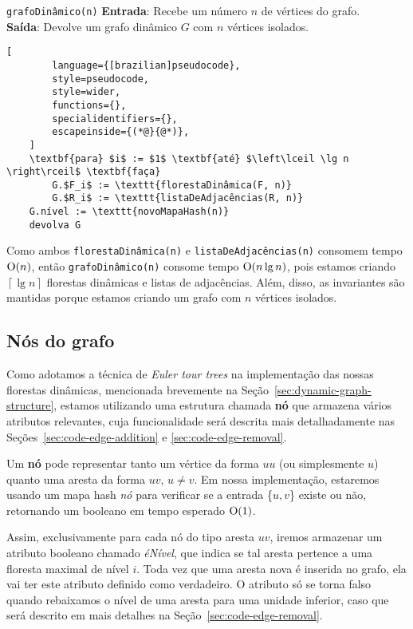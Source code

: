 \begin{programruledcaption}{\texttt{grafoDinâmico(n)} \label{prog:newGD}}
    \noindent\textbf{Entrada}: Recebe um número $n$ de vértices do grafo. \\
    \textbf{Saída}: Devolve um grafo dinâmico $G$ com $n$ vértices isolados.
    \vspace{-0.5\baselineskip}
    \begin{lstlisting}[
        language={[brazilian]pseudocode},
        style=pseudocode,
        style=wider,
        functions={},
        specialidentifiers={},
        escapeinside={(*@}{@*)},
    ]
    \textbf{para} $i$ := $1$ \textbf{até} $\left\lceil \lg n \right\rceil$ \textbf{faça}
        G.$F_i$ := \texttt{florestaDinâmica(F, n)}
        G.$R_i$ := \texttt{listaDeAdjacências(R, n)}
    G.nível := \texttt{novoMapaHash(n)}
    devolva G
    \end{lstlisting}
    \vspace{-0.5\baselineskip}
\end{programruledcaption}

Como ambos \texttt{florestaDinâmica(n)} e \texttt{listaDeAdjacências(n)} consomem tempo $\mathrm{O}(n)$, então \texttt{grafoDinâmico(n)} consome tempo $\mathrm{O}(n \lg n)$, pois estamos criando $\left\lceil \lg n \right\rceil$ florestas dinâmicas e listas de adjacências. Além, disso, as invariantes são mantidas porque estamos criando um grafo com $n$ vértices isolados.

\subsection{Nós do grafo}
\label{sec:graph-nodes}

Como adotamos a técnica de \textit{Euler tour trees} na implementação das nossas florestas dinâmicas, mencionada brevemente na Seção~\ref{sec:dynamic-graph-structure}, estamos utilizando uma estrutura chamada \textbf{nó} que armazena vários atributos relevantes, cuja funcionalidade será descrita mais detalhadamente nas Seções~\ref{sec:code-edge-addition} e \ref{sec:code-edge-removal}. 

Um \textbf{nó} pode representar tanto um vértice da forma $uu$ (ou simplesmente $u$) quanto uma aresta da forma $uv$, $u \neq v$. Em nossa implementação, estaremos usando um mapa hash \textit{nó} para verificar se a entrada \{$u, v$\} existe ou não, retornando um booleano em tempo esperado $\mathrm{O}(1)$.

Assim, exclusivamente para cada nó do tipo aresta $uv$, iremos armazenar um atributo booleano chamado \textit{éNível}, que indica se tal aresta pertence a uma floresta maximal de nível $i$. Toda vez que uma aresta nova é inserida no grafo, ela vai ter este atributo definido como verdadeiro. O atributo só se torna falso quando rebaixamos o nível de uma aresta para uma unidade inferior, caso que será descrito em mais detalhes na Seção~\ref{sec:code-edge-removal}. 

